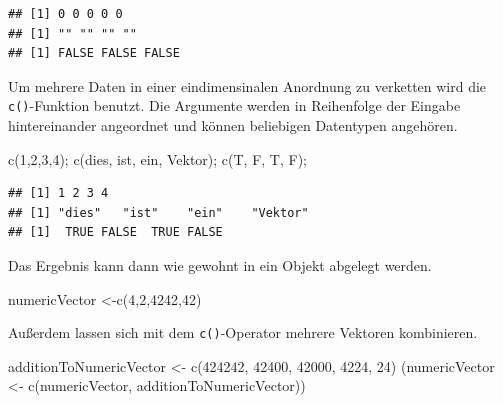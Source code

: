 \documentclass[
]{book}
\newenvironment{Shaded}{\begin{snugshade}}{\end{snugshade}}
\newcommand{\DecValTok}[1]{\textcolor[rgb]{0.00,0.00,0.81}{#1}}
\newcommand{\FunctionTok}[1]{\textcolor[rgb]{0.00,0.00,0.00}{#1}}
\newcommand{\NormalTok}[1]{#1}
\newcommand{\OtherTok}[1]{\textcolor[rgb]{0.56,0.35,0.01}{#1}}
\newcommand{\StringTok}[1]{\textcolor[rgb]{0.31,0.60,0.02}{#1}}
\begin{document}
\begin{verbatim}
## [1] 0 0 0 0 0
## [1] "" "" "" ""
## [1] FALSE FALSE FALSE
\end{verbatim}

Um mehrere Daten in einer eindimensinalen Anordnung zu verketten wird die \texttt{c()}-Funktion benutzt.
Die Argumente werden in Reihenfolge der Eingabe hintereinander angeordnet und können beliebigen Datentypen angehören.

\begin{Shaded}
\begin{Highlighting}[]
\FunctionTok{c}\NormalTok{(}\DecValTok{1}\NormalTok{,}\DecValTok{2}\NormalTok{,}\DecValTok{3}\NormalTok{,}\DecValTok{4}\NormalTok{);}
\FunctionTok{c}\NormalTok{(}\StringTok{\textquotesingle{}dies\textquotesingle{}}\NormalTok{, }\StringTok{\textquotesingle{}ist\textquotesingle{}}\NormalTok{, }\StringTok{\textquotesingle{}ein\textquotesingle{}}\NormalTok{, }\StringTok{\textquotesingle{}Vektor\textquotesingle{}}\NormalTok{);}
\FunctionTok{c}\NormalTok{(T, F, T, F);}
\end{Highlighting}
\end{Shaded}

\begin{verbatim}
## [1] 1 2 3 4
## [1] "dies"   "ist"    "ein"    "Vektor"
## [1]  TRUE FALSE  TRUE FALSE
\end{verbatim}

Das Ergebnis kann dann wie gewohnt in ein Objekt abgelegt werden.

\begin{Shaded}
\begin{Highlighting}[]
\NormalTok{numericVector }\OtherTok{\textless{}{-}}\FunctionTok{c}\NormalTok{(}\DecValTok{4}\NormalTok{,}\DecValTok{2}\NormalTok{,}\DecValTok{4242}\NormalTok{,}\DecValTok{42}\NormalTok{)}
\end{Highlighting}
\end{Shaded}

Außerdem lassen sich mit dem \texttt{c()}-Operator mehrere Vektoren kombinieren.

\begin{Shaded}
\begin{Highlighting}[]
\NormalTok{additionToNumericVector }\OtherTok{\textless{}{-}}  \FunctionTok{c}\NormalTok{(}\DecValTok{424242}\NormalTok{, }\DecValTok{42400}\NormalTok{, }\DecValTok{42000}\NormalTok{,}
                               \DecValTok{4224}\NormalTok{, }\DecValTok{24}\NormalTok{)}
\NormalTok{(numericVector }\OtherTok{\textless{}{-}} \FunctionTok{c}\NormalTok{(numericVector, }
\NormalTok{                    additionToNumericVector))}
\end{Highlighting}
\end{Shaded}
\end{document}
